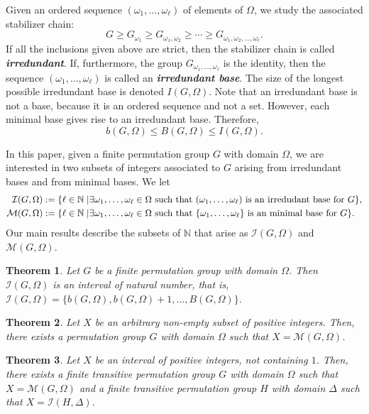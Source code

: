 \documentclass{amsart}
\newtheorem{theorem}{Theorem}[section]
\begin{document}
	Given an ordered sequence $(\omega_1,\ldots,\omega_\ell)$ of elements of $\Omega$, we study the associated stabilizer chain:
	$$G\ge G_{\omega_1}\ge G_{\omega_1,\omega_2}\ge \cdots \ge G_{\omega_1,\omega_2,\ldots,\omega_\ell}.$$
	If all the inclusions given above are strict, then the stabilizer chain is called \textit{\textbf{irredundant}}. If, furthermore, the group $G_{\omega_1,\ldots,\omega_\ell}$ is the identity, then the sequence $(\omega_1,\ldots,\omega_\ell)$ is called an \textit{\textbf{irredundant base}}. The size of the longest possible irredundant base is denoted $I(G,\Omega)$. Note that an irredundant base is not a base, because it is an ordered sequence and not a set.  However, each minimal base gives rise to an irredundant base. Therefore,
	$$b(G,\Omega)\le B(G,\Omega)\le I(G,\Omega).$$
	
	In this paper, given a finite permutation group $G$ with domain $\Omega$, we are interested in two subsets of integers associated to $G$ arising from irredundant bases and from  minimal bases. We let
	\begin{align*}
		\mathcal{I}(G,\Omega):=\{\ell\in\mathbb{N}\mid &\exists \omega_1,\ldots,\omega_\ell\in \Omega\hbox{ such that }(\omega_1,\ldots,\omega_\ell)%
		\hbox{ is an irredudant base for }G\},\\
		\mathcal{M}(G,\Omega):=\{\ell\in\mathbb{N}\mid &\exists \omega_1,\ldots,\omega_\ell\in \Omega\hbox{ such that }\{\omega_1,\ldots,\omega_\ell\}%
		 \hbox{ is an minimal base for }G\}.
	\end{align*}
	Our main results describe the subsets of $\mathbb{N}$ that arise as $\mathcal{I}(G,\Omega)$ and $\mathcal{M}(G,\Omega)$.
	\begin{theorem}\label{thrm:1}
		Let $G$ be a finite permutation group with domain $\Omega$. Then $\mathcal{I}(G,\Omega)$ is an interval of natural number, that is, $\mathcal{I}(G,\Omega)=\{b(G,\Omega),b(G,\Omega)+1,\ldots,B(G,\Omega)\}.$
	\end{theorem}
	\begin{theorem}\label{thrm:2}
		Let $X$ be an arbitrary non-empty subset of positive integers. Then, there exists a permutation group $G$ with domain $\Omega$ such that $X = \mathcal{M}(G,\Omega)$.
	\end{theorem}
	\begin{theorem}\label{thrm:3}
		Let $X$ be an interval of positive integers, not containing $1$. Then, there exists a finite transitive permutation group $G$ with domain $\Omega$ such that  $X=\mathcal{M}(G,\Omega)$ and a finite transitive permutation group $H$ with domain $\Delta$ such that $X = \mathcal{I}(H,\Delta)$.
	\end{theorem}
\end{document}
